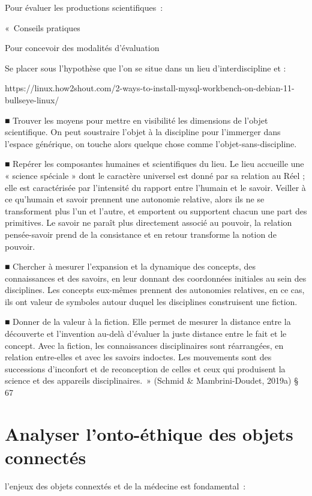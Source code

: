 \documentclass[
  letterpaper,
  DIV=11,
  numbers=noendperiod]{scrreprt}
\begin{document}
Pour évaluer les productions scientifiques~:

«~Conseils pratiques

Pour concevoir des modalités d'évaluation

Se placer sous l'hypothèse que l'on se situe dans un lieu
d'interdiscipline et :

https://linux.how2shout.com/2-ways-to-install-mysql-workbench-on-debian-11-bullseye-linux/

■ Trouver les moyens pour mettre en visibilité les dimensions de l'objet
scientifique. On peut soustraire l'objet à la discipline pour l'immerger
dans l'espace générique, on touche alors quelque chose comme
l'objet-sans-discipline.

■ Repérer les composantes humaines et scientifiques du lieu. Le lieu
accueille une « science spéciale » dont le caractère universel est donné
par sa relation au Réel ; elle est caractérisée par l'intensité du
rapport entre l'humain et le savoir. Veiller à ce qu'humain et savoir
prennent une autonomie relative, alors ils ne se transforment plus l'un
et l'autre, et emportent ou supportent chacun une part des primitives.
Le savoir ne paraît plus directement associé au pouvoir, la relation
pensée-savoir prend de la consistance et en retour transforme la notion
de pouvoir.

■ Chercher à mesurer l'expansion et la dynamique des concepts, des
connaissances et des savoirs, en leur donnant des coordonnées initiales
au sein des disciplines. Les concepts eux-mêmes prennent des autonomies
relatives, en ce cas, ils ont valeur de symboles autour duquel les
disciplines construisent une fiction.

■ Donner de la valeur à la fiction. Elle permet de mesurer la distance
entre la découverte et l'invention au-delà d'évaluer la juste distance
entre le fait et le concept. Avec la fiction, les connaissances
disciplinaires sont réarrangées, en relation entre-elles et avec les
savoirs indoctes. Les mouvements sont des successions d'inconfort et de
reconception de celles et ceux qui produisent la science et des
appareils disciplinaires.~» (Schmid \& Mambrini-Doudet, 2019a) § 67

\hypertarget{sec-analyserOntoEthique}{%
\chapter{Analyser l'onto-éthique des objets
connectés}\label{sec-analyserOntoEthique}}

l'enjeux des objets connextés et de la médecine est fondamental~:
\end{document}
